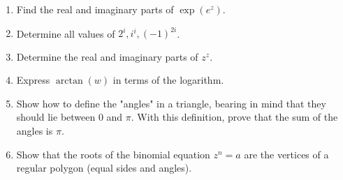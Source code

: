 \begin{enumerate}
\item
  Find the real and imaginary parts of \(\exp(e^z)\).
\item
  Determine all values of \(2^i,i^i,(-1)^{2i}\).
\item
  Determine the real and imaginary parts of \(z^z\).
\item
  Express \(\arctan(w)\) in terms of the logarithm.
\item
  Show how to define the "angles" in a triangle, bearing in mind that they
  should lie between \(0\) and \(\pi\).
  With this definition, prove that the sum of the angles is \(\pi\).
\item
  Show that the roots of the binomial equation \(z^n = a\) are the vertices of
  a regular polygon (equal sides and angles).
\end{enumerate}


